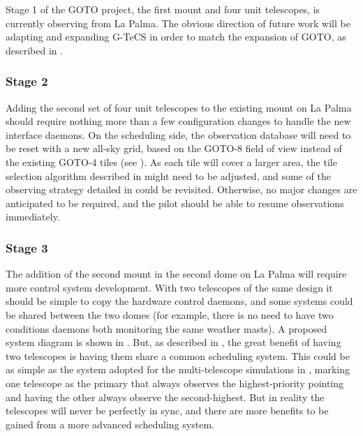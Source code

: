 \begin{colsection}

Stage 1 of the GOTO project, the first mount and four unit telescopes, is currently observing from La Palma. The obvious direction of future work will be adapting and expanding G-TeCS in order to match the expansion of GOTO, as described in .

\subsubsection{Stage 2}

Adding the second set of four unit telescopes to the existing mount on La Palma should require nothing more than a few configuration changes to handle the new interface daemons. On the scheduling side, the observation database will need to be reset with a new all-sky grid, based on the GOTO-8 field of view instead of the existing GOTO-4 tiles (see ). As each tile will cover a larger area, the tile selection algorithm described in  might need to be adjusted, and some of the observing strategy detailed in  could be revisited. Otherwise, no major changes are anticipated to be required, and the pilot should be able to resume observations immediately.

\subsubsection{Stage 3}

The addition of the second mount in the second dome on La Palma will require more control system development. With two telescopes of the same design it should be simple to copy the hardware control daemons, and some systems could be shared between the two domes (for example, there is no need to have two conditions daemons both monitoring the same weather masts). A proposed system diagram is shown in . But, as described in , the great benefit of having two telescopes is having them share a common scheduling system. This could be as simple as the system adopted for the multi-telescope simulations in , marking one telescope as the primary that always observes the highest-priority pointing and having the other always observe the second-highest. But in reality the telescopes will never be perfectly in sync, and there are more benefits to be gained from a more advanced scheduling system.


\end{colsection}
